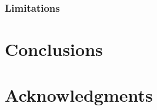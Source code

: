 \documentclass{sig-alternate}
\begin{document}
\subsubsection{Limitations}

\section{Conclusions}



\section*{Acknowledgments}
\label{sec:acknowledgments}



  
\end{document}
